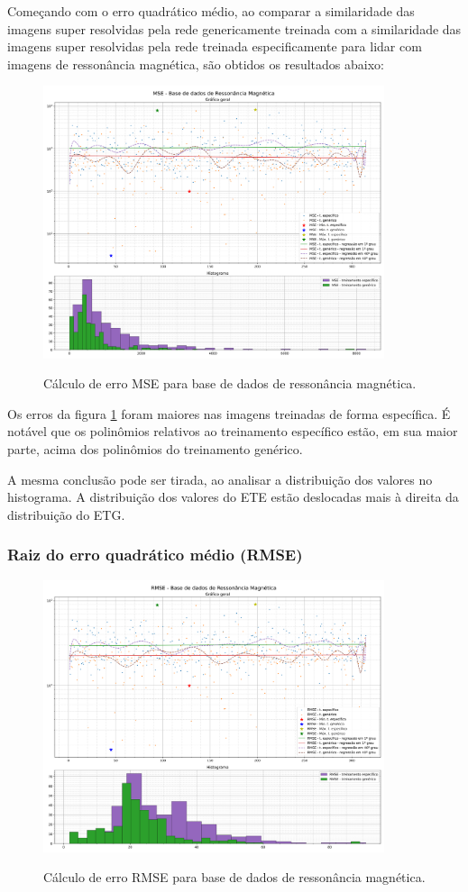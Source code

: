 Começando com o erro quadrático médio, ao comparar a similaridade das imagens super resolvidas pela rede genericamente treinada com a similaridade das imagens super resolvidas pela rede treinada especificamente para lidar com imagens de ressonância magnética, são obtidos os resultados abaixo:

\begin{figure}[H]
    \centering
    \caption{Cálculo de erro MSE para base de dados de ressonância magnética.}
    \includegraphics[width=10cm]{fig/resultados/mri/png/mse_mri_compound.png}
    \label{fig:results:fig1}
\end{figure}

Os erros da figura \ref{fig:results:fig1} foram maiores nas imagens treinadas de forma específica. É notável que os polinômios relativos ao treinamento específico estão, em sua maior parte, acima dos polinômios do treinamento genérico. 

A mesma conclusão pode ser tirada, ao analisar a distribuição dos valores no histograma. A distribuição dos valores do ETE estão deslocadas mais à direita da distribuição do ETG. 


\subsubsection{Raiz do erro quadrático médio (RMSE)}
\label{sec:result:mri:rmse}


\begin{figure}[H]
    \centering
    \caption{Cálculo de erro RMSE para base de dados de ressonância magnética.}
    \includegraphics[width=10cm]{fig/resultados/mri/png/rmse_mri_compound.png}
    \label{fig:results:fig2}
\end{figure}

